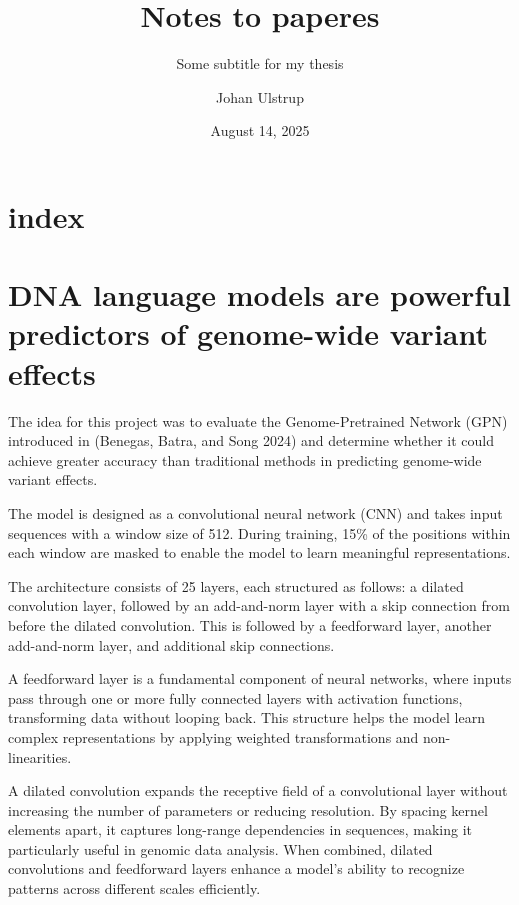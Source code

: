 \documentclass[
  a4paper,
]{scrbook}
\title{Notes to paperes}
\subtitle{Some subtitle for my thesis}
\author{Johan Ulstrup}
\date{August 14, 2025}
\renewcommand*\contentsname{Table of contents}
\newcommand\contentsname{Table of contents}
\begin{document}
\frontmatter
\maketitle

\renewcommand*\contentsname{Table of contents}
{
\setcounter{tocdepth}{1}
\tableofcontents
}

\mainmatter
\chapter{index}\label{index}

\chapter{DNA language models are powerful predictors of genome-wide
variant
effects}\label{dna-language-models-are-powerful-predictors-of-genome-wide-variant-effects}

The idea for this project was to evaluate the Genome-Pretrained Network
(GPN) introduced in (Benegas, Batra, and Song 2024) and determine
whether it could achieve greater accuracy than traditional methods in
predicting genome-wide variant effects.

The model is designed as a convolutional neural network (CNN) and takes
input sequences with a window size of 512. During training, 15\% of the
positions within each window are masked to enable the model to learn
meaningful representations.

The architecture consists of 25 layers, each structured as follows: a
dilated convolution layer, followed by an add-and-norm layer with a skip
connection from before the dilated convolution. This is followed by a
feedforward layer, another add-and-norm layer, and additional skip
connections.

A feedforward layer is a fundamental component of neural networks, where
inputs pass through one or more fully connected layers with activation
functions, transforming data without looping back. This structure helps
the model learn complex representations by applying weighted
transformations and non-linearities.

A dilated convolution expands the receptive field of a convolutional
layer without increasing the number of parameters or reducing
resolution. By spacing kernel elements apart, it captures long-range
dependencies in sequences, making it particularly useful in genomic data
analysis. When combined, dilated convolutions and feedforward layers
enhance a model's ability to recognize patterns across different scales
efficiently.
\end{document}
